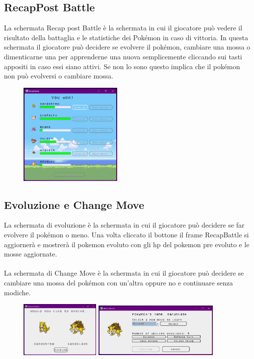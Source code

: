 \documentclass[12pt]{article}
\begin{document}
\subsection{RecapPost Battle}
La schermata Recap post Battle è la schermata in cui il giocatore può vedere il risultato della battaglia e le statistiche dei Pokémon in caso di vittoria.
In questa schermata il giocatore può decidere se evolvere il pokémon, cambiare una mossa o dimenticarne una per apprenderne una nuova semplicemente cliccando sui tasti appositi in caso
essi siano attivi. Se non lo sono questo implica che il pokémon non può evolversi o cambiare mossa.
\begin{figure}[h]
    \centering
    \includegraphics[width=0.45\textwidth]{Images/recapbattle.png}
\end{figure}
\subsection{Evoluzione e Change Move}
La schermata di evoluzione è la schermata in cui il giocatore può decidere se far evolvere il pokémon o meno. Una volta cliccato il bottone il frame RecapBattle si aggiornerà e mostrerà
il pokemon evoluto con gli hp del pokemon pre evoluto e le mosse aggiornate. \\ \\
La schermata di Change Move è la schermata in cui il giocatore può decidere se cambiare una mossa del pokémon con un'altra oppure no e continuare senza modiche.
\begin{figure}[h]
    \centering
    \includegraphics[width=0.35\textwidth]{Images/evolve.png}
    \includegraphics[width=0.55\textwidth]{Images/ability.png}
\end{figure}
\newpage
\end{document}
